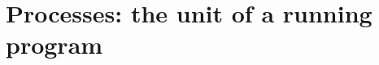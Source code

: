 \chapter{Processes: the unit of a running program}
\label{ch:processes-the-unit-of-a-running-program}

